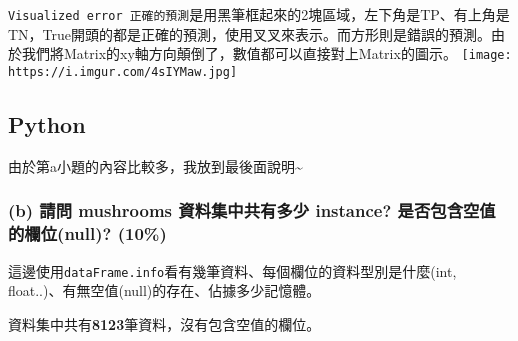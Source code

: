 \documentclass[11pt]{article}
\makeatletter
\def\maxwidth{\ifdim\Gin@nat@width>\linewidth\linewidth
    \else\Gin@nat@width\fi}
\let\Oldincludegraphics\includegraphics
\renewcommand{\includegraphics}[1]{\Oldincludegraphics[width=.8\maxwidth]{#1}}
\makeatother
\begin{document}
\texttt{Visualized\ error\ 正確的預測}是用黑筆框起來的2塊區域，左下角是TP、有上角是TN，True開頭的都是正確的預測，使用叉叉來表示。而方形則是錯誤的預測。由於我們將Matrix的xy軸方向顛倒了，數值都可以直接對上Matrix的圖示。
\texttt{[image: https://i.imgur.com/4sIYMaw.jpg]}

    \subsection{Python}\label{python}

    由於第a小題的內容比較多，我放到最後面說明\textasciitilde{}

\subsubsection{(b) 請問 mushrooms 資料集中共有多少 instance?
是否包含空值的欄位(null)?
(10\%)}\label{b-ux8acbux554f-mushrooms-ux8cc7ux6599ux96c6ux4e2dux5171ux6709ux591aux5c11-instance-ux662fux5426ux5305ux542bux7a7aux503cux7684ux6b04ux4f4dnull-10}

這邊使用\texttt{dataFrame.info}看有幾筆資料、每個欄位的資料型別是什麼(int,
float..)、有無空值(null)的存在、佔據多少記憶體。

資料集中共有\textbf{8123}筆資料，沒有包含空值的欄位。
\end{document}
